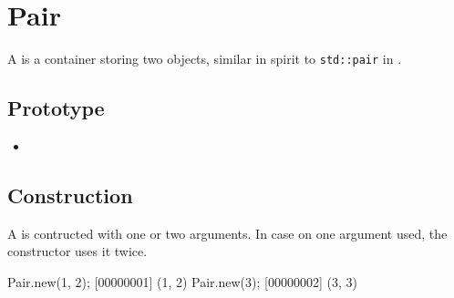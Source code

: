 \section{Pair}

A  is a container storing two objects, similar in spirit to
\lstinline|std::pair| in \Cxx.

\subsection{Prototype}
\begin{itemize}
\item {}
\end{itemize}

\subsection{Construction}

A  is contructed with one or two arguments. In case on one
argument used, the constructor uses it twice.

\begin{urbiscript}
Pair.new(1, 2);
[00000001] (1, 2)
Pair.new(3);
[00000002] (3, 3)
\end{urbiscript}

